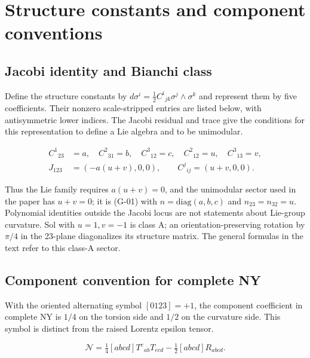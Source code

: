 \section{Structure constants and component conventions}

\subsection{Jacobi identity and Bianchi class}

Define the structure constants by $d\sigma^i=\tfrac12C^i{}_{jk}\sigma^j\wedge\sigma^k$ and represent them by five coefficients. Their nonzero scale-stripped entries are listed below, with antisymmetric lower indices. The Jacobi residual and trace give the conditions for this representation to define a Lie algebra and to be unimodular.

\begin{equation}\tag{A-01}\label{eq:A-01}
\begin{aligned}
C^1{}_{23}&=a,\quad C^2{}_{31}=b,\quad C^3{}_{12}=c,\quad
C^2{}_{12}=u,\quad C^3{}_{13}=v,\\
J_{123}&=(-a(u+v),0,0),\qquad C^j{}_{ij}=(u+v,0,0).
\end{aligned}
\end{equation}

Thus the Lie family requires $a(u+v)=0$, and the unimodular sector used in the paper has $u+v=0$; it is (G-01) with $n=\mathrm{diag}(a,b,c)$ and $n_{23}=n_{32}=u$. Polynomial identities outside the Jacobi locus are not statements about Lie-group curvature. Sol with $u=1,v=-1$ is class A; an orientation-preserving rotation by $\pi/4$ in the 23-plane diagonalizes its structure matrix. The general formulas in the text refer to this class-A sector.

\subsection{Component convention for complete NY}

With the oriented alternating symbol $[0123]=+1$, the component coefficient in complete NY is $1/4$ on the torsion side and $1/2$ on the curvature side. This symbol is distinct from the raised Lorentz epsilon tensor.

\begin{equation}\tag{A-02}\label{eq:A-02}
\mathcal N=\tfrac14[abcd]T^e{}_{ab}T_{ecd}
-\tfrac12[abcd]R_{abcd}.
\end{equation}

